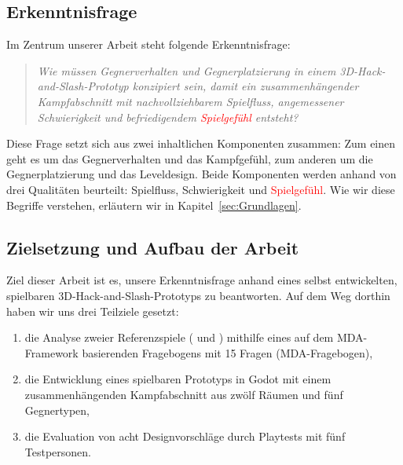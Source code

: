 \documentclass[../Main.tex]{subfiles}
\begin{document}
\subsection{Erkenntnisfrage} \label{sec:Erkenntnisfrage}

Im Zentrum unserer Arbeit steht folgende Erkenntnisfrage:

\vspace{\baselineskip}

\begin{quote}
    \textit{Wie müssen Gegnerverhalten und Gegnerplatzierung in einem 3D-Hack-and-Slash-Prototyp konzipiert sein, damit ein zusammenhängender Kampfabschnitt mit nachvollziehbarem Spielfluss, angemessener Schwierigkeit und befriedigendem \textcolor{red}{Spielgefühl} entsteht?}
\end{quote}

\vspace{\baselineskip}

Diese Frage setzt sich aus zwei inhaltlichen Komponenten zusammen: Zum einen geht es um das Gegnerverhalten und das Kampfgefühl, zum anderen um die Gegnerplatzierung und das Leveldesign. Beide Komponenten werden anhand von drei Qualitäten beurteilt: Spielfluss, Schwierigkeit und \textcolor{red}{Spielgefühl}. Wie wir diese Begriffe verstehen, erläutern wir in Kapitel~\ref{sec:Grundlagen}.

\subsection{Zielsetzung und Aufbau der Arbeit} \label{sec:Aufbau}

Ziel dieser Arbeit ist es, unsere Erkenntnisfrage anhand eines selbst entwickelten, spielbaren 3D-Hack-and-Slash-Prototyps zu beantworten. Auf dem Weg dorthin haben wir uns drei Teilziele gesetzt:

\begin{enumerate}
    \item die Analyse zweier Referenzspiele ( und ) mithilfe eines auf dem MDA-Framework basierenden Fragebogens mit 15 Fragen (MDA-Fragebogen),
    \item die Entwicklung eines spielbaren Prototyps in Godot mit einem zusammenhängenden Kampfabschnitt aus zwölf Räumen und fünf Gegnertypen,
    \item die Evaluation von acht Designvorschläge durch Playtests mit fünf Testpersonen.
\end{enumerate}
\end{document}
